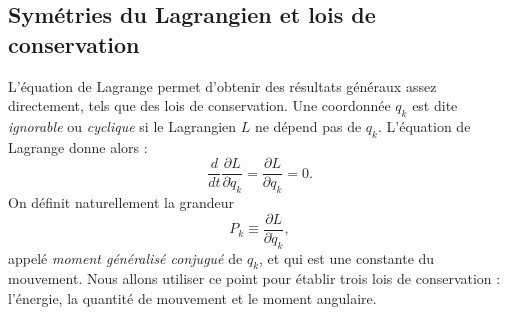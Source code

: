\subsection{Symétries du Lagrangien et lois de conservation}
\label{sec:symlagrange}
L'équation de Lagrange permet d'obtenir des résultats généraux assez directement, tels que des lois de conservation. Une coordonnée $q_k$ est dite \textit{ignorable} ou \textit{cyclique} si le Lagrangien $L$ ne dépend pas de $q_k$. L'équation de Lagrange donne alors :
\begin{equation*}
\frac{d}{dt}\frac{\partial L}{\partial \dot{q}_k} = \frac{\partial L}{\partial q_k} = 0.
\end{equation*}
On définit naturellement la grandeur 
\begin{equation*}
P_k\equiv\frac{\partial L}{\partial \dot{q}_k},
\end{equation*}
appelé \textit{moment généralisé conjugué} de $q_k$, et qui est une constante du mouvement. Nous allons utiliser ce point pour établir trois lois de conservation : l'énergie, la quantité de mouvement et le moment angulaire.

